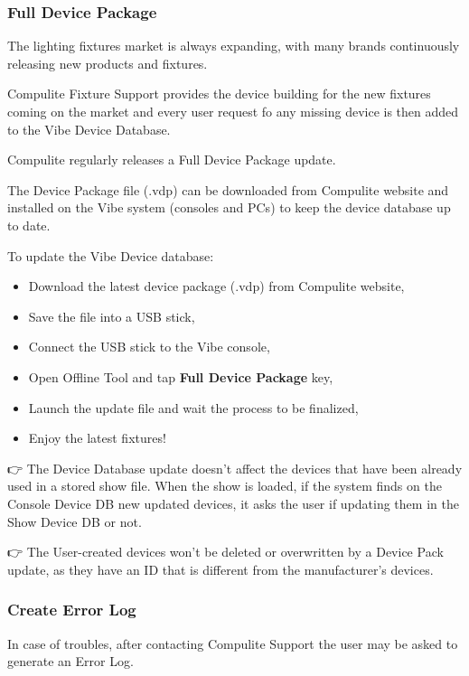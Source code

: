 \documentclass[
]{article}
\begin{document}
\hypertarget{full-device-package}{%
\subsubsection{Full Device Package}\label{full-device-package}}

The lighting fixtures market is always expanding, with many brands continuously releasing new products and fixtures.

Compulite Fixture Support provides the device building for the new fixtures coming on the market and every user request fo any missing device is then added to the Vibe Device Database.

Compulite regularly releases a Full Device Package update.

The Device Package file (.vdp) can be downloaded from Compulite website and installed on the Vibe system (consoles and PCs) to keep the device database up to date.

To update the Vibe Device database:

\begin{itemize}
\item
  Download the latest device package (.vdp) from Compulite website,
\item
  Save the file into a USB stick,
\item
  Connect the USB stick to the Vibe console,
\item
  Open Offline Tool and tap \textbf{Full Device Package} key,
\item
  Launch the update file and wait the process to be finalized,
\item
  Enjoy the latest fixtures!
\end{itemize}

👉 The Device Database update doesn't affect the devices that have been already used in a stored show file. When the show is loaded, if the system finds on the Console Device DB new updated devices, it asks the user if updating them in the Show Device DB or not.

👉 The User-created devices won't be deleted or overwritten by a Device Pack update, as they have an ID that is different from the manufacturer's devices.

\hypertarget{create-error-log}{%
\subsubsection{Create Error Log}\label{create-error-log}}

In case of troubles, after contacting Compulite Support the user may be asked to generate an Error Log.
\end{document}
